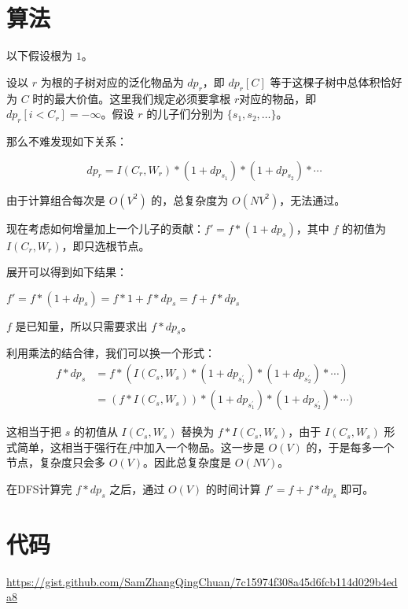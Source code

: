 \documentclass{article}
\begin{document}
\section{算法}

以下假设根为 $1$。

设以 $r$ 为根的子树对应的泛化物品为 $dp_r$，即 $dp_r[C]$ 等于这棵子树中总体积恰好为 $C$ 时的最大价值。这里我们规定必须要拿根 $r$对应的物品，即 $dp_r[i<C_r] = -\infty$。假设 $r$ 的儿子们分别为 $\{s_1,s_2,\ldots \}$。

那么不难发现如下关系：

$$
dp_r = I(C_r,W_r) * (1+dp_{s_1})* (1+dp_{s_2}) * \cdots
$$

由于计算组合每次是 $O(V^2)$ 的，总复杂度为 $O(NV^2)$，无法通过。

现在考虑如何增量加上一个儿子的贡献：$f' = f * (1+dp_s)$，其中 $f$ 的初值为 $I(C_r,W_r)$，即只选根节点。

展开可以得到如下结果：
\begin{center}
    $f' = f * (1+dp_s) = f*1 + f*dp_s = f + f*dp_s$
\end{center}

$f$ 是已知量，所以只需要求出 $f*dp_s$。

利用乘法的结合律，我们可以换一个形式：
\begin{align*}
    f*dp_s
    &= f * (I(C_s,W_s) * (1+dp_{s_{1}^{\prime}})* (1+dp_{s_2^{\prime}}) * \cdots)\\
    &= (f * I(C_s,W_s)) * (1+dp_{s_{1}^{\prime}})* (1+dp_{s_2^{\prime}}) * \cdots)
\end{align*}

这相当于把 $s$ 的初值从 $I(C_s,W_s)$ 替换为 $f * I(C_s,W_s)$，由于 $I(C_s,W_s)$ 形式简单，这相当于强行在$f$中加入一个物品。这一步是 $O(V)$ 的，于是每多一个节点，复杂度只会多 $O(V)$。因此总复杂度是 $O(NV)$。

在DFS计算完 $f*dp_s$ 之后，通过 $O(V)$ 的时间计算 $f' = f+f*dp_s$ 即可。

\section{代码}
\url{https://gist.github.com/SamZhangQingChuan/7c15974f308a45d6fcb114d029b4eda8}
\end{document}
